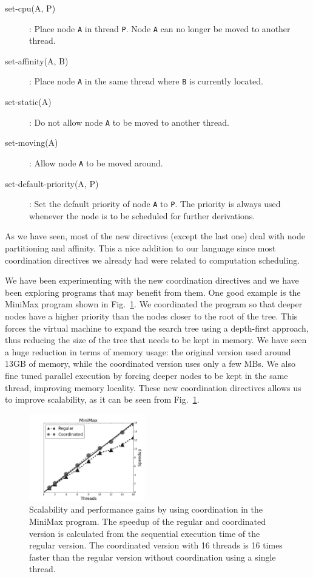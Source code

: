 \documentclass[10pt]{article}
\begin{document}
\begin{description}
   \item[set-cpu(A, P)]: Place node \texttt{A} in thread \texttt{P}. Node
   \texttt{A} can no longer be moved to another thread.
   \item[set-affinity(A, B)]: Place node \texttt{A} in the same thread where
   \texttt{B} is currently located.
   \item[set-static(A)]: Do not allow node \texttt{A} to be moved to another
   thread.
   \item[set-moving(A)]: Allow node \texttt{A} to be moved around.
   \item[set-default-priority(A, P)]: Set the default priority of node
   \texttt{A} to \texttt{P}. The priority is always used whenever the node is to
   be scheduled for further derivations.
\end{description}

As we have seen, most of the new directives (except the last one) deal with node
partitioning and affinity. This a nice addition to our language since most
coordination directives we already had were related to computation scheduling.

We have been experimenting with the new coordination directives and we have been
exploring programs that may benefit from them. One good example is the MiniMax
program shown in Fig.~\ref{fig:coord}. We coordinated the program so that deeper
nodes have a higher priority than the nodes closer to the root of the tree. This
forces the virtual machine to expand the search tree using a depth-first
approach, thus reducing the size of the tree that needs to be kept in memory. We
have seen a huge reduction in terms of memory usage: the original version used
around 13GB of memory, while the coordinated version uses only a few MBs. We
also fine tuned parallel execution by forcing deeper nodes to be kept in the
same thread, improving memory locality. These new coordination directives allows
us to improve scalability, as it can be seen from Fig.~\ref{fig:coord}.

\begin{figure}[ht]
  \begin{center}
   \includegraphics[width=0.45\textwidth]{figures/coord_min-max-tictactoe}
\end{center}
\caption{Scalability and performance gains by using coordination in the MiniMax
   program. The speedup of the regular and coordinated version is calculated
   from the sequential execution time of the regular version. The coordinated
   version with 16 threads is 16 times faster than the regular version without
   coordination using a single thread.}
\label{fig:coord}
\end{figure}
\end{document}
